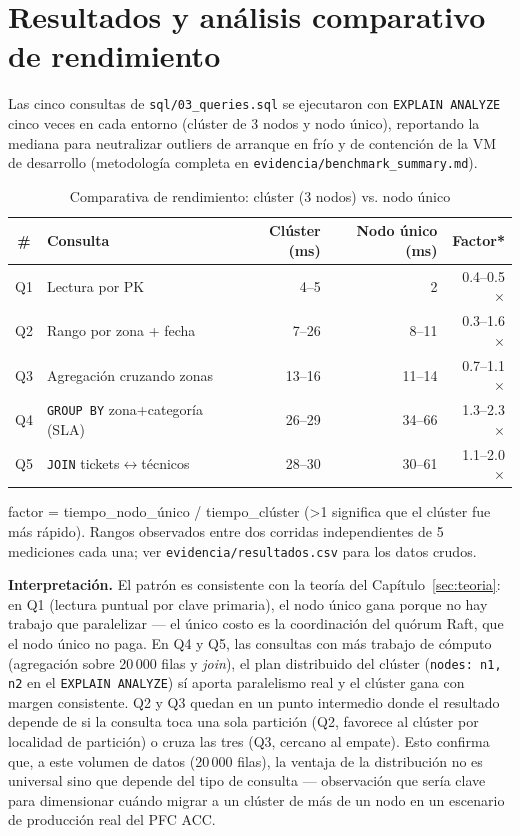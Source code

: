 \documentclass[11pt,a4paper]{article}
\begin{document}
\section{Resultados y análisis comparativo de rendimiento}
\label{sec:resultados}

Las cinco consultas de \texttt{sql/03\_queries.sql} se ejecutaron con
\texttt{EXPLAIN ANALYZE} cinco veces en cada entorno (clúster de 3 nodos y
nodo único), reportando la mediana para neutralizar outliers de arranque en
frío y de contención de la VM de desarrollo (metodología completa en
\texttt{evidencia/benchmark\_summary.md}).

\begin{table}[H]
\centering
\caption{Comparativa de rendimiento: clúster (3 nodos) vs. nodo único}
\label{tab:benchmark}
\begin{tabular}{@{}clrrr@{}}
\toprule
\# & Consulta & Clúster (ms) & Nodo único (ms) & Factor* \\
\midrule
Q1 & Lectura por PK & 4--5 & 2 & 0.4--0.5$\times$ \\
Q2 & Rango por zona + fecha & 7--26 & 8--11 & 0.3--1.6$\times$ \\
Q3 & Agregación cruzando zonas & 13--16 & 11--14 & 0.7--1.1$\times$ \\
Q4 & \texttt{GROUP BY} zona+categoría (SLA) & 26--29 & 34--66 & 1.3--2.3$\times$ \\
Q5 & \texttt{JOIN} tickets$\leftrightarrow$técnicos & 28--30 & 30--61 & 1.1--2.0$\times$ \\
\bottomrule
\end{tabular}

\vspace{0.2cm}
\footnotesize *factor = tiempo\_nodo\_único / tiempo\_clúster (>1 significa que el clúster fue más rápido). Rangos observados entre dos corridas independientes de 5 mediciones cada una; ver \texttt{evidencia/resultados.csv} para los datos crudos.
\end{table}

\textbf{Interpretación.} El patrón es consistente con la teoría del
Capítulo~\ref{sec:teoria}: en Q1 (lectura puntual por clave primaria), el
nodo único gana porque no hay trabajo que paralelizar --- el único costo es
la coordinación del quórum Raft, que el nodo único no paga. En Q4 y Q5, las
consultas con más trabajo de cómputo (agregación sobre 20\,000 filas y
\emph{join}), el plan distribuido del clúster (\texttt{nodes: n1, n2} en el
\texttt{EXPLAIN ANALYZE}) sí aporta paralelismo real y el clúster gana con
margen consistente. Q2 y Q3 quedan en un punto intermedio donde el resultado
depende de si la consulta toca una sola partición (Q2, favorece al clúster
por localidad de partición) o cruza las tres (Q3, cercano al empate). Esto
confirma que, a este volumen de datos (20\,000 filas), la ventaja de la
distribución no es universal sino que depende del tipo de consulta ---
observación que sería clave para dimensionar cuándo migrar a un clúster de
más de un nodo en un escenario de producción real del PFC ACC.
\end{document}
